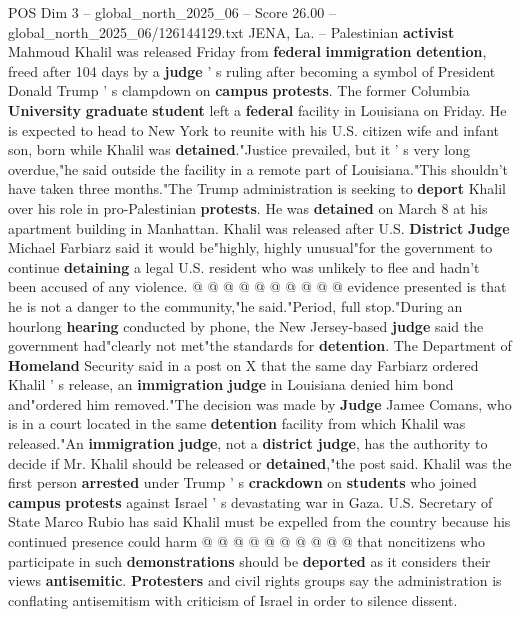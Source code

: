 \begin{textsample}{POS Dim 3 – global\_north\_2025\_06 – Score 26.00 – global\_north\_2025\_06/126144129.txt}  \label{ex:f3_pos_093}
JENA, La. -- Palestinian \textbf{activist} Mahmoud Khalil was released Friday from \textbf{federal} \textbf{immigration} \textbf{detention}, freed after 104 days by a \textbf{judge} ' s ruling after becoming a symbol of President Donald Trump ' s clampdown on \textbf{campus} \textbf{protests}.
The former Columbia \textbf{University} \textbf{graduate} \textbf{student} left a \textbf{federal} facility in Louisiana on Friday.
He is expected to head to New York to reunite with his U.S. citizen wife and infant son, born while Khalil was \textbf{detained}."Justice prevailed, but it ' s very long overdue,"he said outside the facility in a remote part of Louisiana."This shouldn't have taken three months."The Trump administration is seeking to \textbf{deport} Khalil over his role in pro-Palestinian \textbf{protests}.
He was \textbf{detained} on March 8 at his apartment building in Manhattan.
Khalil was released after U.S. \textbf{District} \textbf{Judge} Michael Farbiarz said it would be"highly, highly unusual"for the government to continue \textbf{detaining} a legal U.S. resident who was unlikely to flee and hadn't been accused of any violence. @ @ @ @ @ @ @ @ @ @ evidence presented is that he is not a danger to the community,"he said."Period, full stop."During an hourlong \textbf{hearing} conducted by phone, the New Jersey-based \textbf{judge} said the government had"clearly not met"the standards for \textbf{detention}.
The Department of \textbf{Homeland} Security said in a post on X that the same day Farbiarz ordered Khalil ' s release, an \textbf{immigration} \textbf{judge} in Louisiana denied him bond and"ordered him removed."The decision was made by \textbf{Judge} Jamee Comans, who is in a court located in the same \textbf{detention} facility from which Khalil was released."An \textbf{immigration} \textbf{judge}, not a \textbf{district} \textbf{judge}, has the authority to decide if Mr.
Khalil should be released or \textbf{detained},"the post said.
Khalil was the first person \textbf{arrested} under Trump ' s \textbf{crackdown} on \textbf{students} who joined \textbf{campus} \textbf{protests} against Israel ' s devastating war in Gaza.
U.S.
Secretary of State Marco Rubio has said Khalil must be expelled from the country because his continued presence could harm @ @ @ @ @ @ @ @ @ @ that noncitizens who participate in such \textbf{demonstrations} should be \textbf{deported} as it considers their views \textbf{antisemitic}. \textbf{Protesters} and civil rights groups say the administration is conflating antisemitism with criticism of Israel in order to silence dissent.

\end{textsample}
